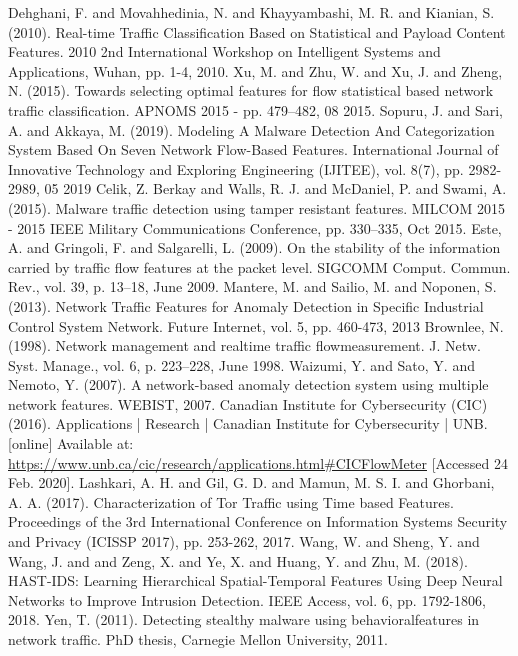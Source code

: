 \documentclass[conference]{IEEEtran}
\begin{document}
\begin{thebibliography}{00}
 Dehghani, F. and Movahhedinia, N. and Khayyambashi, M. R. and Kianian, S. (2010). Real-time Traffic Classification Based on Statistical and Payload Content Features. 2010 2nd International Workshop on Intelligent Systems and Applications, Wuhan, pp. 1-4, 2010.
 Xu, M. and Zhu, W. and Xu, J. and Zheng, N. (2015). Towards selecting optimal features for flow statistical based network traffic classification. APNOMS 2015 - pp. 479–482, 08 2015.
 Sopuru, J. and Sari, A. and Akkaya, M. (2019). Modeling A Malware Detection And Categorization System Based On Seven Network Flow-Based Features. International Journal of Innovative Technology and Exploring Engineering (IJITEE), vol. 8(7), pp. 2982-2989, 05 2019
 Celik, Z. Berkay and Walls, R. J. and McDaniel, P. and Swami, A. (2015). Malware traffic detection using tamper resistant features. MILCOM 2015 - 2015 IEEE Military Communications Conference, pp. 330–335, Oct 2015.
 Este, A. and Gringoli, F. and Salgarelli, L. (2009). On the stability of the information carried by traffic flow features at the packet level. SIGCOMM Comput. Commun. Rev., vol. 39, p. 13–18, June 2009.
 Mantere, M. and Sailio, M. and Noponen, S. (2013). Network Traffic Features for Anomaly Detection in Specific Industrial Control System Network. Future Internet, vol. 5, pp. 460-473, 2013
 Brownlee, N. (1998). Network management and realtime traffic flowmeasurement. J. Netw. Syst. Manage., vol. 6, p. 223–228, June 1998.
 Waizumi, Y. and Sato, Y. and Nemoto, Y. (2007). A network-based anomaly detection system using multiple network features. WEBIST, 2007.
 Canadian Institute for Cybersecurity (CIC) (2016). Applications | Research | Canadian Institute for Cybersecurity | UNB. [online] Available at: \url{https://www.unb.ca/cic/research/applications.html#CICFlowMeter} [Accessed 24 Feb. 2020].
 Lashkari, A. H. and Gil, G. D. and Mamun, M. S. I. and Ghorbani, A. A. (2017). Characterization of Tor Traffic using Time based Features. Proceedings of the 3rd International Conference on Information Systems Security and Privacy (ICISSP 2017), pp. 253-262, 2017.
 Wang, W. and Sheng, Y. and Wang, J. and and Zeng, X. and Ye, X. and Huang, Y. and Zhu, M. (2018). HAST-IDS: Learning Hierarchical Spatial-Temporal Features Using Deep Neural Networks to Improve Intrusion Detection. IEEE Access, vol. 6, pp. 1792-1806, 2018.
 Yen, T. (2011). Detecting stealthy malware using behavioralfeatures in network traffic. PhD thesis, Carnegie Mellon University, 2011.

\end{thebibliography}
\end{document}
